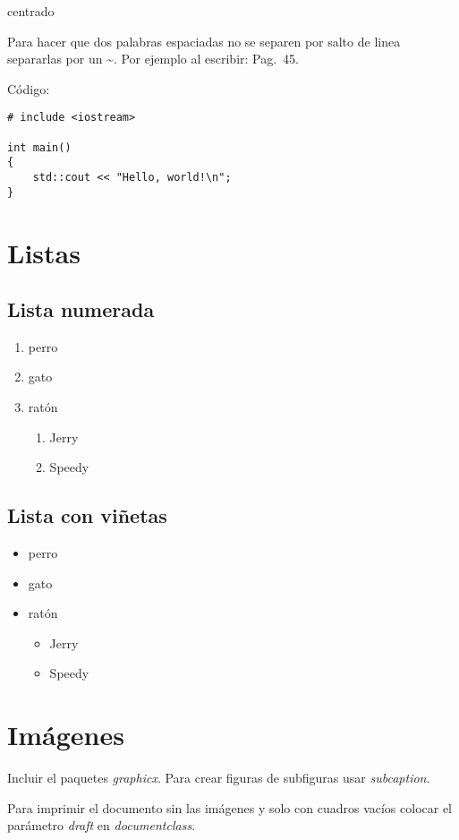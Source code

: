 \documentclass[12pt, a4paper,twoside]{article} %
\begin{document}
\begin{center}
centrado %
\end{center}

Para hacer que dos palabras espaciadas no se separen por salto de linea separarlas por un \textasciitilde{}. Por ejemplo al escribir:  Pag.~45.

Código:
\begin{lstlisting}
# include <iostream>
 
int main()
{
	std::cout << "Hello, world!\n";
}
\end{lstlisting}

\section{Listas}
\subsection{Lista numerada}
\begin{enumerate}
\item perro
\item gato
\item ratón
	\begin{enumerate}
	\item Jerry
	\item Speedy
	\end{enumerate}
\end{enumerate}
\subsection{Lista con viñetas}
\begin{itemize}
\item perro
\item gato
\item ratón
	\begin{itemize}
	\item Jerry
	\item Speedy
	\end{itemize}
\end{itemize}

\section{Imágenes}
Incluir el paquetes \emph{graphicx}. Para crear figuras de subfiguras usar \emph{subcaption}. 

Para imprimir el documento sin las imágenes y solo con cuadros vacíos colocar el parámetro \emph{draft} en \emph{documentclass}. 
\end{document}

